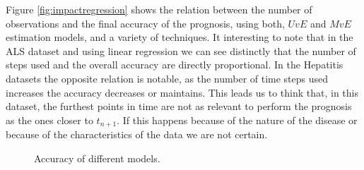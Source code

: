 Figure \ref{fig:impactregression} shows the relation between the number of observations and the final accuracy of the prognosis, using both, $UvE$ and $MvE$
 estimation models, and a variety of techniques. It interesting to note that in the ALS dataset and using linear regression we can see distinctly that
 the number of steps used and the overall accuracy are directly proportional. In the Hepatitis datasets the opposite relation is notable, as the number 
 of time steps used increases the accuracy decreases or maintains. This leads us to think that, in this dataset, the furthest points in time are not as 
 relevant to perform the prognosis as the ones closer to $t_{n+1}$. If this happens because of the nature of the disease or because of the characteristics of the data we are not certain.

 \begin{figure}[h]
  \begin{subfigmatrix}{2}
  \end{subfigmatrix}
  \caption{Accuracy of different models.}
  \label{fig:accuracyregression}
\end{figure}


